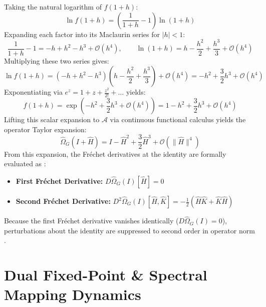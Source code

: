 \documentclass[11pt,a4paper]{article}
\begin{document}
Taking the natural logarithm of $f(1+h)$:
\begin{equation}
\ln f(1+h) = \left(\frac{1}{1+h} - 1\right)\ln(1+h)
\end{equation}
Expanding each factor into its Maclaurin series for $|h| < 1$:
\begin{equation}
\frac{1}{1+h} - 1 = -h + h^2 - h^3 + \mathcal{O}(h^4), \qquad \ln(1+h) = h - \frac{h^2}{2} + \frac{h^3}{3} + \mathcal{O}(h^4)
\end{equation}
Multiplying these two series gives:
\begin{equation}
\ln f(1+h) = (-h + h^2 - h^3)\left(h - \frac{h^2}{2} + \frac{h^3}{3}\right) + \mathcal{O}(h^4) = -h^2 + \frac{3}{2}h^3 + \mathcal{O}(h^4)
\end{equation}
Exponentiating via $e^z = 1 + z + \frac{z^2}{2!} + \dots$ yields:
\begin{equation}
f(1+h) = \exp\left(-h^2 + \frac{3}{2}h^3 + \mathcal{O}(h^4)\right) = 1 - h^2 + \frac{3}{2}h^3 + \mathcal{O}(h^4)
\end{equation}
Lifting this scalar expansion to $\mathcal{A}$ via continuous functional calculus yields the operator Taylor expansion:
\begin{equation}
\hat{\Omega}_G(I + \hat{H}) = I - \hat{H}^2 + \frac{3}{2}\hat{H}^3 + \mathcal{O}(\|\hat{H}\|^4)
\end{equation}
From this expansion, the Fr\'echet derivatives at the identity are formally evaluated as \cite{Cartan}:
\begin{itemize}
    \item \textbf{First Fr\'echet Derivative:} $D\hat{\Omega}_G(I)[\hat{H}] = 0$
    \item \textbf{Second Fr\'echet Derivative:} $D^2\hat{\Omega}_G(I)[\hat{H}, \hat{K}] = -\frac{1}{2}(\hat{H}\hat{K} + \hat{K}\hat{H})$
\end{itemize}
Because the first Fr\'echet derivative vanishes identically ($D\hat{\Omega}_G(I) = 0$), perturbations about the identity are suppressed to second order in operator norm \cite{Cartan}.

\section{Dual Fixed-Point \& Spectral Mapping Dynamics}
\end{document}
